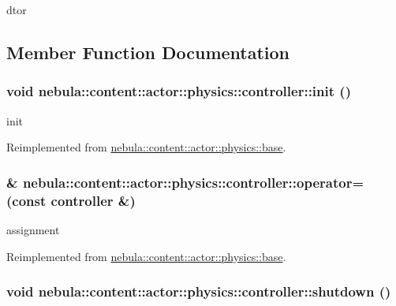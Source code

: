 dtor 

\subsection{Member Function Documentation}
\hypertarget{classnebula_1_1content_1_1actor_1_1physics_1_1controller_adcc26e24dd15484de04d73b0043cda75}{
\subsubsection[{init}]{\setlength{\rightskip}{0pt plus 5cm}void nebula::content::actor::physics::controller::init ()}}
\label{classnebula_1_1content_1_1actor_1_1physics_1_1controller_adcc26e24dd15484de04d73b0043cda75}


init 

Reimplemented from \hyperlink{classnebula_1_1content_1_1actor_1_1physics_1_1base_a606d649258515421027e98aef1f91f7f}{nebula::content::actor::physics::base}.\hypertarget{classnebula_1_1content_1_1actor_1_1physics_1_1controller_a8ef51f82c285732fd3c5919c1019caa8}{
\subsubsection[{operator=}]{\& nebula::content::actor::physics::controller::operator= (const {\bf controller} \&)}}
\label{classnebula_1_1content_1_1actor_1_1physics_1_1controller_a8ef51f82c285732fd3c5919c1019caa8}


assignment 

Reimplemented from \hyperlink{classnebula_1_1content_1_1actor_1_1physics_1_1base_a8b950d8d7230bd6899cb3da7b6116f02}{nebula::content::actor::physics::base}.\hypertarget{classnebula_1_1content_1_1actor_1_1physics_1_1controller_a826208e0d0b4cdcf52882b4eab3bd361}{
\subsubsection[{shutdown}]{\setlength{\rightskip}{0pt plus 5cm}void nebula::content::actor::physics::controller::shutdown ()}}
\label{classnebula_1_1content_1_1actor_1_1physics_1_1controller_a826208e0d0b4cdcf52882b4eab3bd361}


